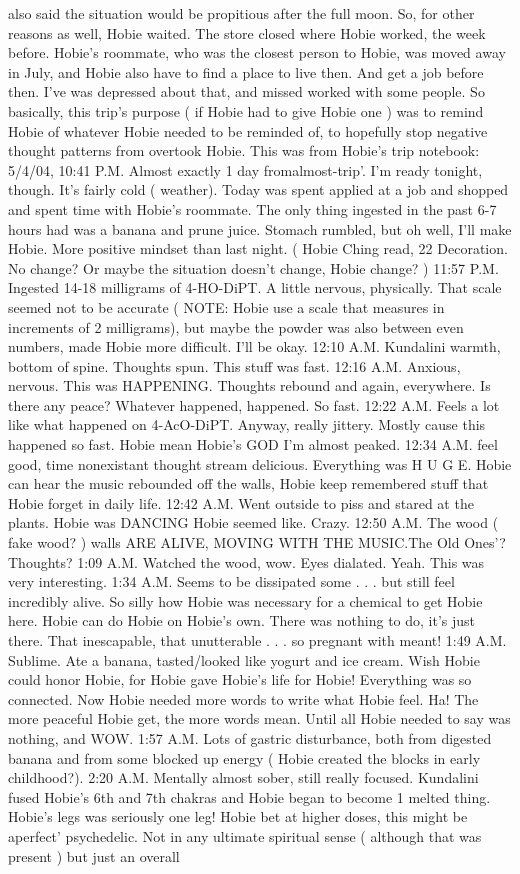 \documentclass[12pt]{book}
\begin{document}
also said the situation would be propitious after the full moon. So, for other reasons as well, Hobie waited. The store closed where Hobie worked, the week before. Hobie's roommate, who was the closest person to Hobie, was moved away in July, and Hobie also have to find a place to live then. And get a job before then. I've was depressed about that, and missed worked with some people. So basically, this trip's purpose ( if Hobie had to give Hobie one ) was to remind Hobie of whatever Hobie needed to be reminded of, to hopefully stop negative thought patterns from overtook Hobie. This was from Hobie's trip notebook: 5/4/04, 10:41 P.M. Almost exactly 1 day fromalmost-trip'. I'm ready tonight, though. It's fairly cold ( weather). Today was spent applied at a job and shopped and spent time with Hobie's roommate. The only thing ingested in the past 6-7 hours had was a banana and prune juice. Stomach rumbled, but oh well, I'll make Hobie. More positive mindset than last night. ( Hobie Ching read, 22 Decoration. No change? Or maybe the situation doesn't change, Hobie change? ) 11:57 P.M. Ingested 14-18 milligrams of 4-HO-DiPT. A little nervous, physically. That scale seemed not to be accurate ( NOTE: Hobie use a scale that measures in increments of 2 milligrams), but maybe the powder was also between even numbers, made Hobie more difficult. I'll be okay. 12:10 A.M. Kundalini warmth, bottom of spine. Thoughts spun. This stuff was fast. 12:16 A.M. Anxious, nervous. This was HAPPENING. Thoughts rebound and again, everywhere. Is there any peace? Whatever happened, happened. So fast. 12:22 A.M. Feels a lot like what happened on 4-AcO-DiPT. Anyway, really jittery. Mostly cause this happened so fast. Hobie mean Hobie's GOD I'm almost peaked. 12:34 A.M. feel good, time nonexistant thought stream delicious. Everything was H U G E. Hobie can hear the music rebounded off the walls, Hobie keep remembered stuff that Hobie forget in daily life. 12:42 A.M. Went outside to piss and stared at the plants. Hobie was DANCING Hobie seemed like. Crazy. 12:50 A.M. The wood ( fake wood? ) walls ARE ALIVE, MOVING WITH THE MUSIC.The Old Ones'? Thoughts? 1:09 A.M. Watched the wood, wow. Eyes dialated. Yeah. This was very interesting. 1:34 A.M. Seems to be dissipated some . . .  but still feel incredibly alive. So silly how Hobie was necessary for a chemical to get Hobie here. Hobie can do Hobie on Hobie's own. There was nothing to do, it's just there. That inescapable, that unutterable . . .  so pregnant with meant! 1:49 A.M. Sublime. Ate a banana, tasted/looked like yogurt and ice cream. Wish Hobie could honor Hobie, for Hobie gave Hobie's life for Hobie! Everything was so connected. Now Hobie needed more words to write what Hobie feel. Ha! The more peaceful Hobie get, the more words mean. Until all Hobie needed to say was nothing, and WOW. 1:57 A.M. Lots of gastric disturbance, both from digested banana and from some blocked up energy ( Hobie created the blocks in early childhood?). 2:20 A.M. Mentally almost sober, still really focused. Kundalini fused Hobie's 6th and 7th chakras and Hobie began to become 1 melted thing. Hobie's legs was seriously one leg! Hobie bet at higher doses, this might be aperfect' psychedelic. Not in any ultimate spiritual sense ( although that was present ) but just an overall 
\end{document}
